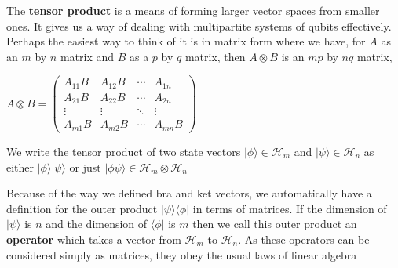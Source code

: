 \documentclass[12pt,a4paper]{article}
\numberwithin{equation}{section}
\begin{document}
\vskip 2mm

The {\bf tensor product} is a means of forming larger vector spaces from smaller ones. It gives us a way of dealing with multipartite systems of qubits effectively. Perhaps the easiest way to think of it is in matrix form where we have, for $A$ as an $m$ by $n$ matrix and $B$ as a $p$ by $q$ matrix, then $A \otimes B$ is an $mp$ by $nq$ matrix, \begin{center} $A \otimes B = \begin{pmatrix} A_{11}B & A_{12}B & \cdots & A_{1n} \\ A_{21}B & A_{22}B & \cdots & A_{2n} \\ \vdots & \vdots & \ddots & \vdots \\ A_{m1}B & A_{m2}B & \cdots & A_{mn}B \end{pmatrix}$ \end{center}
We write the tensor product of two state vectors $|\phi\rangle \in \mathcal{H}_m$ and $|\psi\rangle \in \mathcal{H}_n$ as either $|\phi\rangle|\psi\rangle$ or just $|\phi\psi\rangle \in \mathcal{H}_{m}\otimes\mathcal{H}_{n}$

\vskip 2mm

Because of the way we defined bra and ket vectors, we automatically have a definition for the outer product $|\psi\rangle\langle\phi|$ in terms of matrices. If the dimension of $|\psi\rangle$ is $n$ and the dimension of $\langle\phi|$ is $m$ then we call this outer product an {\bf operator} which takes a vector from $\mathcal{H}_m$ to $\mathcal{H}_n$. As these operators can be considered simply as matrices, they obey the usual laws of linear algebra

\vskip 2mm
\end{document}
